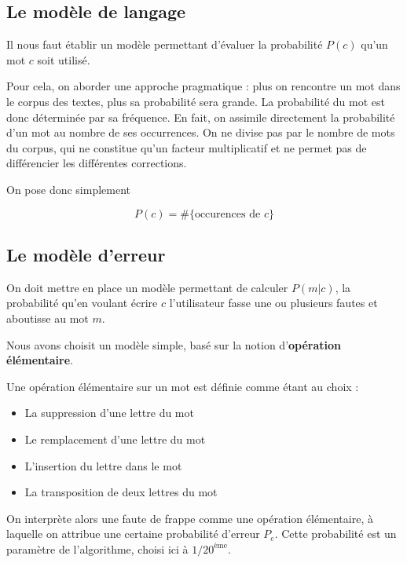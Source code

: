 \documentclass[10pt,a4paper]{article}
\begin{document}
\subsection{Le modèle de langage}

Il nous faut établir un modèle permettant d'évaluer la probabilité $P(c)$ qu'un mot $c$ soit utilisé.

Pour cela, on aborder une approche pragmatique : plus on rencontre un mot dans le corpus des textes, plus sa probabilité sera grande. La probabilité du mot est donc déterminée par sa fréquence.
En fait, on assimile directement la probabilité d'un mot au nombre de ses occurrences. On ne divise pas par le nombre de mots du corpus, qui ne constitue qu'un facteur multiplicatif et ne permet pas de différencier les différentes corrections.

On pose donc simplement

\begin{equation}
P(c) = \#\{\text{occurences de }c\}
\end{equation}

\subsection{Le modèle d'erreur}

On doit mettre en place un modèle permettant de calculer $P(m|c)$, la probabilité qu'en voulant écrire $c$ l'utilisateur fasse une ou plusieurs fautes et aboutisse au mot $m$.

Nous avons choisit un modèle simple, basé sur la notion d'\textbf{opération élémentaire}.

Une opération élémentaire sur un mot est définie comme étant au choix : \\

\begin{itemize}
\item La suppression d'une lettre du mot
\item Le remplacement d'une lettre du mot
\item L'insertion du lettre dans le mot
\item La transposition de deux lettres du mot
\end{itemize}

On interprète alors une faute de frappe comme une opération élémentaire, à laquelle on attribue une certaine probabilité d'erreur $P_e$. Cette probabilité est un paramètre de l'algorithme, choisi ici à $1/20^{\text{ème}}$.\\
\end{document}
